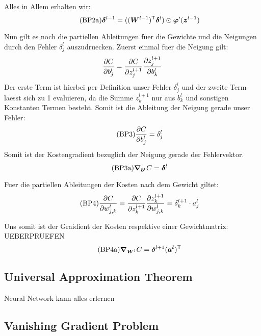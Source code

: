 Alles in Allem erhalten wir:
\begin{equation}\tag{BP2a}
  \bm{\delta}^{l-1} = ((\bm{W}^{l-1})^{\mathsf{T}} \bm{\delta}^l) \odot \bm{\varphi}'(\bm{z}^{l-1})
\end{equation}

\para{}

Nun gilt es noch die partiellen Ableitungen fuer die Gewichte und die Neigungen
durch den Fehler $\delta_j^l$ auszudruecken.
Zuerst einmal fuer die Neigung gilt:
\begin{equation*}
  \frac{\partial C}{\partial b_j^l} = \frac{\partial C}{\partial z_j^{l+1}} \frac{\partial z_j^{l+1}}{\partial b_k^l}
\end{equation*}
Der erste Term ist hierbei per Definition unser Fehler $\delta_j^l$ und der
zweite Term laesst sich zu 1 evaluieren, da die Summe $z_k^{l+1}$ nur aus
$b_k^l$ und sonstigen Konstanten Termen besteht.
Somit ist die Ableitung der Neigung gerade unser Fehler:
\begin{equation}\tag{BP3}
  \frac{\partial C}{\partial b_j^l} = \delta_j^l
\end{equation}
Somit ist der Kostengradient bezuglich der Neigung gerade der Fehlervektor.
\begin{equation}\tag{BP3a}
  \bm{\nabla}_{\bm{b^l}} C =  \bm{\delta}^l
\end{equation}

Fuer die partiellen Ableitungen der Kosten nach dem Gewicht giltet:
\begin{equation}\tag{BP4}
  \frac{\partial C}{\partial w_{j,k}^l} = \frac{\partial C}{\partial z_k^{l+1}} \frac{\partial z_k^{l+1}}{\partial w_{j,k}^l} = \delta_k^{l+1} \cdot a_j^l
\end{equation}

Uns somit ist der Graidient der Kosten respektive einer Gewichtmatrix:
UEBERPRUEFEN
\begin{equation}\tag{BP4a}
  \bm{\nabla}_{\bm{W}^l} C = \bm{\delta}^{l+1} (\bm{a^l})^{\mathsf{T}}
\end{equation}



\cite{Nielsen}

\pagebreak

\subsection{Universal Approximation Theorem}\label{sec:UAT}
Neural Network kann alles erlernen

\subsection{Vanishing Gradient Problem}

